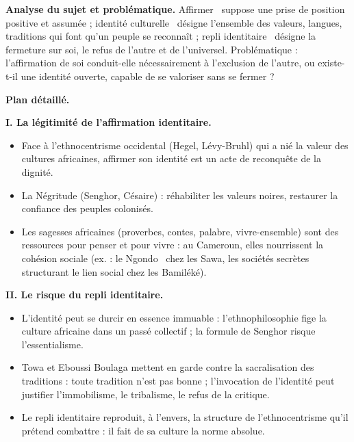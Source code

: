 \documentclass[11pt]{article}
\begin{document}
\begin{corrige}

\textbf{Analyse du sujet et problématique.} \guillemotleft Affirmer \guillemotright\ suppose une prise de position positive et assumée ; \guillemotleft identité culturelle \guillemotright\ désigne l'ensemble des valeurs, langues, traditions qui font qu'un peuple se reconnaît ; \guillemotleft repli identitaire \guillemotright\ désigne la fermeture sur soi, le refus de l'autre et de l'universel. Problématique : l'affirmation de soi conduit-elle nécessairement à l'exclusion de l'autre, ou existe-t-il une identité ouverte, capable de se valoriser sans se fermer ?

\textbf{Plan détaillé.}

\textbf{I. La légitimité de l'affirmation identitaire.}
\begin{itemize}
\item Face à l'ethnocentrisme occidental (Hegel, Lévy-Bruhl) qui a nié la valeur des cultures africaines, affirmer son identité est un acte de reconquête de la dignité.
\item La Négritude (Senghor, Césaire) : réhabiliter les valeurs noires, restaurer la confiance des peuples colonisés.
\item Les sagesses africaines (proverbes, contes, palabre, vivre-ensemble) sont des ressources pour penser et pour vivre : au Cameroun, elles nourrissent la cohésion sociale (ex. : le \guillemotleft Ngondo \guillemotright\ chez les Sawa, les sociétés secrètes structurant le lien social chez les Bamiléké).
\end{itemize}

\textbf{II. Le risque du repli identitaire.}
\begin{itemize}
\item L'identité peut se durcir en essence immuable : l'ethnophilosophie fige la culture africaine dans un passé collectif ; la formule de Senghor risque l'essentialisme.
\item Towa et Eboussi Boulaga mettent en garde contre la sacralisation des traditions : toute tradition n'est pas bonne ; l'invocation de l'identité peut justifier l'immobilisme, le tribalisme, le refus de la critique.
\item Le repli identitaire reproduit, à l'envers, la structure de l'ethnocentrisme qu'il prétend combattre : il fait de sa culture la norme absolue.
\end{itemize}


\end{corrige}
\end{document}
